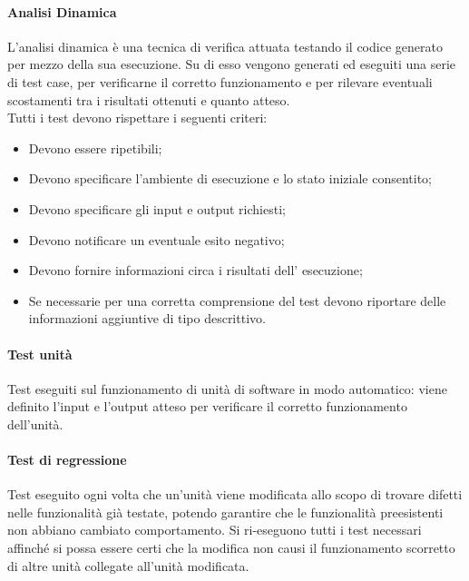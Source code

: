             \paragraph{Analisi Dinamica}
                L’analisi dinamica è una tecnica di verifica attuata testando il codice generato per mezzo della sua esecuzione. Su di esso vengono generati ed eseguiti una serie di test case, per verificarne il corretto funzionamento e per rilevare eventuali scostamenti tra i risultati ottenuti e quanto atteso. \\
                Tutti i test devono rispettare i seguenti criteri: \\
                \begin{itemize}
                    \item Devono essere ripetibili;
                    \item Devono specificare l’ambiente di esecuzione e lo stato iniziale consentito;
                    \item Devono specificare gli input e output richiesti;
                    \item Devono notificare un eventuale esito negativo;
                    \item Devono fornire informazioni circa i risultati dell’ esecuzione;
                    \item Se necessarie per una corretta comprensione del test devono riportare delle informazioni aggiuntive di tipo descrittivo.
                \end{itemize}
                \paragraph{Test unità}
                    Test eseguiti sul funzionamento di unità di software in modo automatico: viene definito l'input e l'output atteso per verificare il corretto funzionamento dell'unità.\\
                \paragraph{Test di regressione}
                    Test eseguito ogni volta che un'unità viene modificata allo scopo di trovare difetti nelle funzionalità già testate, potendo garantire che le funzionalità preesistenti non abbiano cambiato comportamento. Si ri-eseguono tutti i test necessari affinché si possa essere certi che la modifica non causi il funzionamento scorretto di altre unità collegate all'unità modificata.\\
